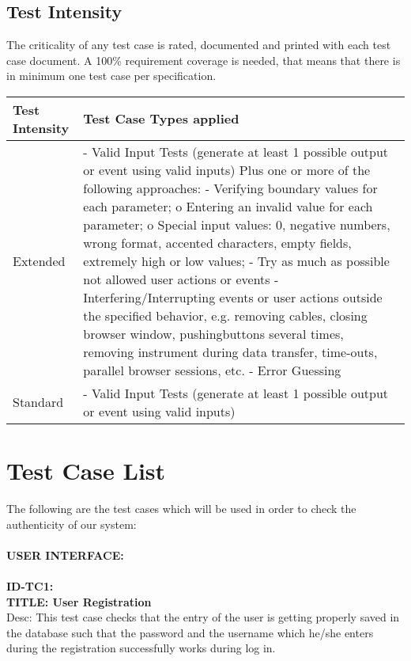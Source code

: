 \documentclass{article}
\begin{document}
\subsection{Test Intensity}
The criticality of any test case is rated, documented and printed with each test case document.
A 100\% requirement coverage is needed, that means that there is in minimum one test case per specification.
\begin{flushleft}
    \begin{tabular}{|p{3cm}|p{11cm}|}
        \hline
	    Test Intensity &Test Case Types applied\\
        \hline
			Extended &  {-	Valid Input Tests (generate at least 1 possible output or event using valid inputs) \newline
Plus one or more of the following approaches:\newline
-	Verifying boundary values for each parameter;\newline
o	Entering an invalid value for each parameter;\newline
o	Special input values: 0, negative numbers, wrong format, accented characters, empty fields, extremely high or low values;\newline
-	Try as much as possible not allowed user actions or events\newline
-	Interfering/Interrupting events or user actions outside the specified behavior, e.g. removing cables, closing browser window, pushing\newline buttons several times, removing instrument during data transfer, time-outs, parallel browser sessions, etc.\newline
-	Error Guessing\newline
}\\
			\hline
Standard	& -	Valid Input Tests (generate at least 1 possible output or event using valid inputs)\\
        \hline
	    
        
    \end{tabular}
\end{flushleft}


\section{Test Case List}
The following are  the test cases which will be used in order to check the authenticity of our system:\\
\vspace{0.5cm}
\\ \textbf{USER INTERFACE:}\\
\vspace{0.5cm}
\\ \textbf{ID-TC1:}\\
 \textbf{TITLE: User Registration}\\
Desc: This test case checks that the entry of the user is getting properly saved in the database such that the password and the username which he/she enters during the registration successfully works during log in.\\
\end{document}
